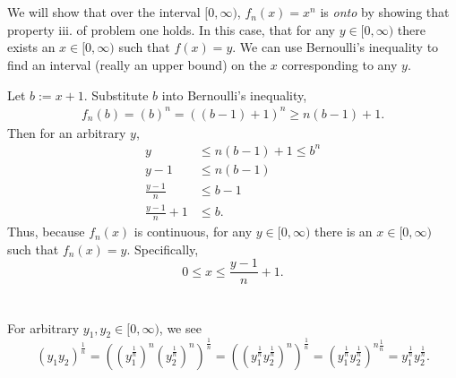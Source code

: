 \documentclass[12 pt,letterpaper]{article}
\begin{document}
\clearpage
\section{}

We will show that over the interval \([0,\infty)\), \(f_n(x)=x^n\)
is \emph{onto} by showing that property iii. of problem one holds.
In this case, that for any \(y\in[0,\infty)\)
there exists an \(x\in[0,\infty)\) such that \(f(x) = y\).
We can use Bernoulli's inequality to find an interval
(really an upper bound) on the \(x\) corresponding to any \(y\).

Let \(b:=x+1\). Substitute \(b\) into Bernoulli's inequality,
\begin{align*}
    f_n(b)
    = (b)^n
    = ((b-1)+1)^n
    \geq n(b-1)+1.
\end{align*}
Then for an arbitrary \(y\),
\begin{align*}
    y &\leq n(b-1)+1 \leq b^n\\
    y-1 &\leq n(b-1) \\
    \frac{y-1}{n} &\leq b-1 \\
    \frac{y-1}{n}+1 &\leq b.
\end{align*}
Thus, because \(f_n(x)\) is continuous,
for any \(y\in[0,\infty)\)
there is an \(x\in[0,\infty)\)
such that \(f_n(x) = y\).
Specifically, \[ 0\leq x \leq \frac{y-1}{n}+1. \]

\section{}
For arbitrary \(y_1,y_2\in[0,\infty)\), we see
\[
    \left(y_1 y_2 \right)^\frac{1}{n} 
    = \left((y_1^{\frac{1}{n}})^n (y_2^{\frac{1}{n}})^n \right)^\frac{1}{n}
    = \left(\left(y_1^{\frac{1}{n}} y_2^{\frac{1}{n}}\right) ^n \right)^\frac{1}{n}
    = \left(y_1^{\frac{1}{n}} y_2^{\frac{1}{n}} \right)^{n\frac{1}{n}}
    = y_1^{\frac{1}{n}} y_2^{\frac{1}{n}}.
\]
\end{document}
